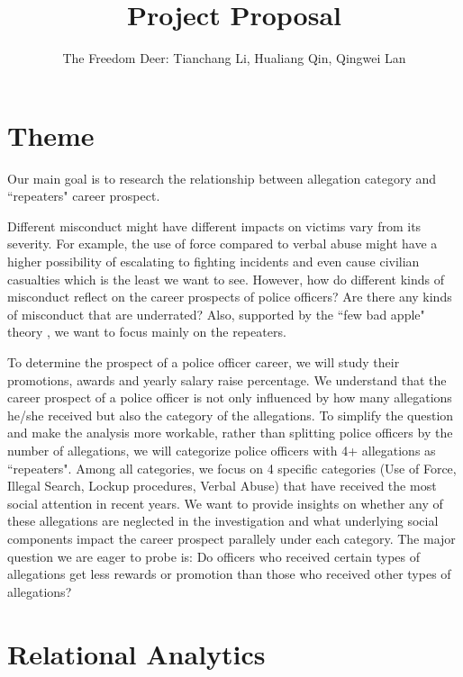 \documentclass[12pt]{article}
\title{Project Proposal}
\author{The Freedom Deer: Tianchang Li, Hualiang Qin, Qingwei Lan}
\begin{document}
\maketitle


\section{Theme}

Our main goal is to research the relationship between allegation category and ``repeaters" career prospect.

Different misconduct might have different impacts on victims vary from its severity. For example, the use of force compared to verbal abuse might have a higher possibility of escalating to fighting incidents and even cause civilian casualties which is the least we want to see. However, how do different kinds of misconduct reflect on the career prospects of police officers? Are there any kinds of misconduct that are underrated? Also, supported by the ``few bad apple" theory \cite{badcops}, we want to focus mainly on the repeaters.


To determine the prospect of a police officer career, we will study their promotions, awards and yearly salary raise percentage. We understand that the career prospect of a police officer is not only influenced by how many allegations he/she received but also the category of the allegations. To simplify the question and make the analysis more workable, rather than splitting police officers by the number of allegations, we will categorize police officers with 4+ allegations as ``repeaters". Among all categories, we focus on 4 specific categories (Use of Force, Illegal Search, Lockup procedures, Verbal Abuse) that have received the most social attention in recent years. We want to provide insights on whether any of these allegations are neglected in the investigation and what underlying social components impact the career prospect parallely under each category. The major question we are eager to probe is: Do officers who received certain types of allegations get less rewards or promotion than those who received other types of allegations?



\section{Relational Analytics}
\end{document}
